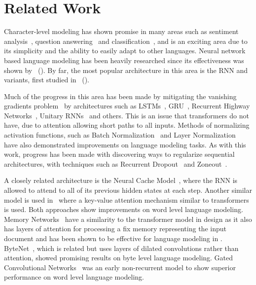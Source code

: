 \documentclass[letterpaper]{article}
\newcommand{\newcite}[1]{\citeauthor{#1}~(\citeyear{#1})}
\begin{document}
\section{Related Work}
Character-level modeling has shown promise in many areas such as sentiment analysis~\cite{DBLP:journals/corr/RadfordJS17}, question answering~\cite{kenter2018byte} and classification~\cite{DBLP:journals/corr/ZhangZL15}, and is an exciting area due to its simplicity and the ability to easily adapt to other languages.
Neural network based language modeling has been heavily researched since its effectiveness was shown by \newcite{Bengio:2003:NPL:944919.944966}.
By far, the most popular architecture in this area is the RNN and variants, first studied in \newcite{conf/interspeech/MikolovKBCK10}.


Much of the progress in this area has been made by mitigating the vanishing gradients problem~\cite{hochreiter2001gradient} by architectures such as LSTMs~\cite{LSTM}, GRU~\cite{DBLP:journals/corr/ChoMGBSB14}, Recurrent Highway Networks~\cite{DBLP:journals/corr/ZillySKS16}, Unitary RNNs~\cite{DBLP:journals/corr/ArjovskySB15} and others. This is an issue that transformers do not have, due to attention allowing short paths to all inputs.
Methods of normalizing activation functions, such as Batch Normalization~\cite{DBLP:journals/corr/IoffeS15,DBLP:journals/corr/abs-1708-02182} and Layer Normalization~\cite{2016arXiv160706450L} have also demonstrated improvements on language modeling tasks. As with this work, progress has been made with discovering ways to regularize sequential architectures, with techniques such as Recurrent Dropout~\cite{DBLP:journals/corr/ZarembaSV14,2015arXiv151205287G} and Zoneout~\cite{krueger2016zoneout,rocki2016surprisal}.

A closely related architecture is the Neural Cache Model~\cite{DBLP:journals/corr/GraveJU16}, where the RNN is allowed to attend to all of its previous hidden states at each step. Another similar model is used in~\cite{DBLP:journals/corr/DanilukRWR17} where a key-value attention mechanism similar to transformers is used. Both approaches show improvements on word level language modeling. Memory Networks~\cite{DBLP:journals/corr/WestonCB14} have a similarity to the transformer model in design as it also has layers of attention for processing a fix memory representing the input document and has been shown to be effective for language modeling in \cite{sukhbaatar2015end}. ByteNet~\cite{kalchbrenner2016neural}, which is related but uses layers of dilated convolutions rather than attention, showed promising results on byte level language modeling. Gated Convolutional Networks~\cite{DBLP:journals/corr/DauphinFAG16} was an early non-recurrent model to show superior performance on word level language modeling.
\end{document}
